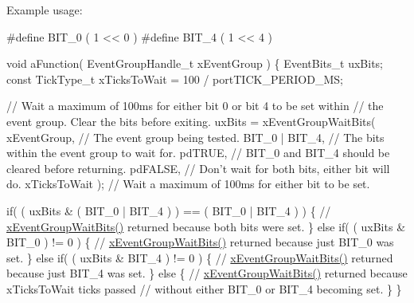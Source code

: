 Example usage\+: 
\begin{DoxyPre}
  #define BIT\_0 ( 1 << 0 )
  #define BIT\_4 ( 1 << 4 )\end{DoxyPre}



\begin{DoxyPre}  void aFunction( EventGroupHandle\_t xEventGroup )
  \{
  EventBits\_t uxBits;
  const TickType\_t xTicksToWait = 100 / portTICK\_PERIOD\_MS;\end{DoxyPre}



\begin{DoxyPre}    // Wait a maximum of 100ms for either bit 0 or bit 4 to be set within
    // the event group.  Clear the bits before exiting.
    uxBits = xEventGroupWaitBits(
                xEventGroup,    // The event group being tested.
                BIT\_0 | BIT\_4,  // The bits within the event group to wait for.
                pdTRUE,         // BIT\_0 and BIT\_4 should be cleared before returning.
                pdFALSE,        // Don't wait for both bits, either bit will do.
                xTicksToWait ); // Wait a maximum of 100ms for either bit to be set.\end{DoxyPre}



\begin{DoxyPre}    if( ( uxBits \& ( BIT\_0 | BIT\_4 ) ) == ( BIT\_0 | BIT\_4 ) )
    \{
        // \hyperlink{externals_2freertos_2include_2event__groups_8h_aab9d5b405bc57b7624dcabe9a9a503db}{xEventGroupWaitBits()} returned because both bits were set.
    \}
    else if( ( uxBits \& BIT\_0 ) != 0 )
    \{
        // \hyperlink{externals_2freertos_2include_2event__groups_8h_aab9d5b405bc57b7624dcabe9a9a503db}{xEventGroupWaitBits()} returned because just BIT\_0 was set.
    \}
    else if( ( uxBits \& BIT\_4 ) != 0 )
    \{
        // \hyperlink{externals_2freertos_2include_2event__groups_8h_aab9d5b405bc57b7624dcabe9a9a503db}{xEventGroupWaitBits()} returned because just BIT\_4 was set.
    \}
    else
    \{
        // \hyperlink{externals_2freertos_2include_2event__groups_8h_aab9d5b405bc57b7624dcabe9a9a503db}{xEventGroupWaitBits()} returned because xTicksToWait ticks passed
        // without either BIT\_0 or BIT\_4 becoming set.
    \}
  \}
  \end{DoxyPre}
 